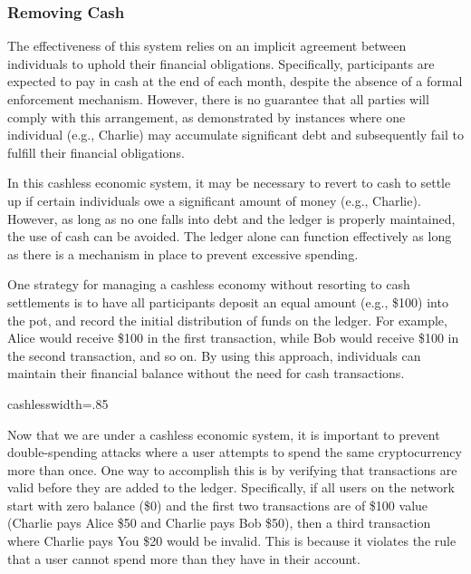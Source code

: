 \subsubsection{Removing Cash}
The effectiveness of this system relies on an implicit agreement between individuals to uphold their financial obligations.
Specifically, participants are expected to pay in cash at the end of each month, despite the absence of a formal enforcement
mechanism. However, there is no guarantee that all parties will comply with this arrangement, as demonstrated by instances
where one individual (e.g., Charlie) may accumulate significant debt and subsequently fail to fulfill their financial obligations.

In this cashless economic system, it may be necessary to revert to cash to settle up if certain individuals owe a significant
amount of money (e.g., Charlie). However, as long as no one falls into debt and the ledger is properly maintained, the
use of cash can be avoided. The ledger alone can function effectively as long as there is a mechanism in place to prevent
excessive spending.

One strategy for managing a cashless economy without resorting to cash settlements is to have all participants deposit an
equal amount (e.g., \$100) into the pot, and record the initial distribution of funds on the ledger. For example, Alice
would receive \$100 in the first transaction, while Bob would receive \$100 in the second transaction, and so on. By using
this approach, individuals can maintain their financial balance without the need for cash transactions.

{cashless}{width=.85\textwidth}%

Now that we are under a cashless economic system, it is important to prevent double-spending attacks where a user attempts
to spend the same cryptocurrency more than once. One way to accomplish this is by verifying that transactions are valid
before they are added to the ledger. Specifically, if all users on the network start with zero balance (\$0) and the first
two transactions are of \$100 value (Charlie pays Alice \$50 and Charlie pays Bob \$50), then a third transaction where
Charlie pays You \$20 would be invalid. This is because it violates the rule that a user cannot spend more than they have
in their account.

%

